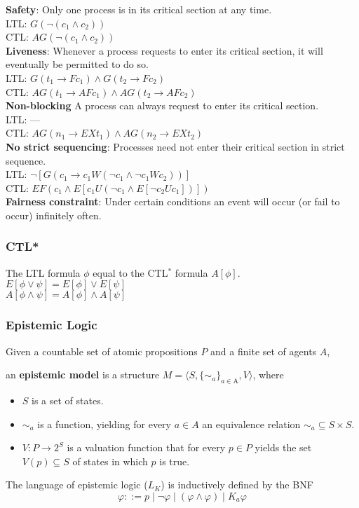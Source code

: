 \documentclass{article}
\begin{document}
\textbf{Safety}: Only one process is in its critical section at any time.\\
LTL: $G(\neg(c_1\land c_2))$\\
CTL: $AG(\neg(c_1\land c_2))$\\

\textbf{Liveness}: Whenever a process requests to enter its critical section, it will eventually be permitted to do so.\\
LTL: $G(t_1\rightarrow Fc_1)\land G(t_2\rightarrow Fc_2)$\\
CTL: $AG(t_1\rightarrow AFc_1)\land AG(t_2\rightarrow AFc_2)$\\

\textbf{Non-blocking} A process can always request to enter its critical section.\\
LTL: ---\\
CTL: $AG(n_1\rightarrow EXt_1)\land AG(n_2\rightarrow EXt_2)$\\

\textbf{No strict sequencing}: Processes need not enter their critical section in strict sequence.\\
LTL: $\neg[G(c_1\rightarrow c_1W(\neg c_1\land\neg c_1Wc_2))]$\\
CTL: $EF(c_1\land E[c_1 U(\neg c_1\land E[\neg c_2 Uc_1])])$\\

\textbf{Fairness constraint}: Under certain conditions an event will occur (or fail to occur) infinitely often.

\subsubsection{CTL*}
The LTL formula $\phi$ equal to the CTL$^*$ formula $A[\phi]$.\\

$E[\phi\lor\psi]=E[\phi]\lor E[\psi]$\\
$A[\phi\land\psi]=A[\phi]\land A[\psi]$

\subsubsection{Epistemic Logic}
Given a countable set of atomic propositions $P$ and a finite set of agents $A$,

\noindent an \textbf{epistemic model} is a structure $M = \langle S, \{\sim_a\}_{a\in \text{A}}, V\rangle$, where
\begin{itemize}
\setlength\itemsep{.1em}
  \item $S$ is a set of states.
  \item $\sim_a$ is a function, yielding for every $a\in A$ an equivalence relation $\sim_a\subseteq S\times S$.
  \item $V:P\rightarrow2^S$ is a valuation function that for every $p\in P$ yields the set $V(p)\subseteq S$ of states in which $p$ is true.
\end{itemize}
The language of epistemic logic ($L_K$) is inductively defined by the BNF
\[\varphi ::= p \mid \neg\varphi \mid (\varphi\land\varphi) \mid K_a\varphi \]
\end{document}
